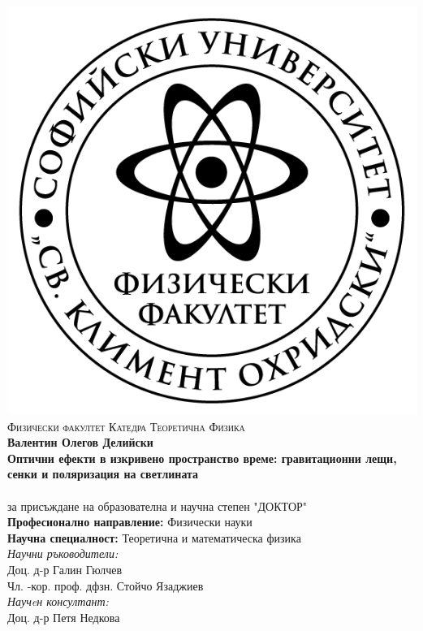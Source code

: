 
\thispagestyle{empty}
\begin{center}

		\centering
		\includegraphics[scale = 1]{logo-FzF.png}
		\noindent\makebox[\linewidth]{\rule{15cm}{0.8pt}}
		\textsc{Физически факултет}
		\noindent\makebox[\linewidth]{\rule{15cm}{0.8pt}}
		\textsc{Катедра Теоретична	 Физика}\\
		\bigskip
		\bigskip
		\bigskip
		\bigskip
		{\Large{\textbf{Валентин Олегов Делийски}}}\\
		\bigskip
		\bigskip
		\bigskip
		{\Large \textbf{Оптични ефекти в изкривено пространство време: гравитационни лещи, сенки и поляризация на светлината}}\\
		\bigskip
		\bigskip
		\bigskip
		{\textbf{\huge {}}}\\
		\bigskip
		за присъждане на образователна и научна степен "ДОКТОР"\\
		\bigskip
		\bigskip
		\bigskip
		\textbf{Професионално направление:} Физически науки\\
		\textbf{Научна специалност:} Теоретична и математическа физика\\
		\bigskip
		\bigskip
		\bigskip
		\bigskip
		\textit{Научни ръководители:}\\
		Доц. д-р Галин Гюлчев\\
		\bigskip
		Чл. -кор. проф. дфзн. Стойчо Язаджиев\\
		\bigskip
		\textit{Научeн консултант:}\\
		Доц. д-р Петя Недкова\\
		

\end{center}

	